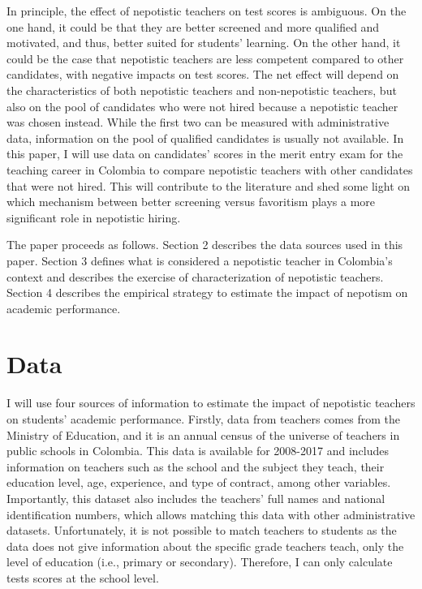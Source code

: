 \documentclass[12pt,runningheads]{article}
\begin{document}
In principle, the effect of nepotistic teachers on test scores is ambiguous. On the one hand, it could be that they are better screened and more qualified and motivated, and thus, better suited for students' learning. On the other hand, it could be the case that nepotistic teachers are less competent compared to other candidates, with negative impacts on test scores. The net effect will depend on the characteristics of both nepotistic teachers and non-nepotistic teachers, but also on the pool of candidates who were not hired because a nepotistic teacher was chosen instead. While the first two can be measured with administrative data, information on the pool of qualified candidates is usually not available. In this paper, I will use data on candidates' scores in the merit entry exam for the teaching career in Colombia to compare nepotistic teachers with other candidates that were not hired. This will contribute to the literature and shed some light on which mechanism between better screening versus favoritism plays a more significant role in nepotistic hiring.

The paper proceeds as follows. Section 2 describes the data sources used in this paper. Section 3 defines what is considered a nepotistic teacher in Colombia's context and describes the exercise of characterization of nepotistic teachers. Section 4 describes the empirical strategy to estimate the impact of nepotism on academic performance.

\section{Data} 
I will use four sources of information to estimate the impact of nepotistic teachers on students' academic performance. Firstly, data from teachers comes from the Ministry of Education, and it is an annual census of the universe of teachers in public schools in Colombia. This data is available for 2008-2017 and includes information on teachers such as the school and the subject they teach, their education level, age, experience, and type of contract, among other variables. Importantly, this dataset also includes the teachers' full names and national identification numbers, which allows matching this data with other administrative datasets. Unfortunately, it is not possible to match teachers to students as the data does not give information about the specific grade teachers teach, only the level of education (i.e., primary or secondary). Therefore, I can only calculate tests scores at the school level. 
\end{document}
